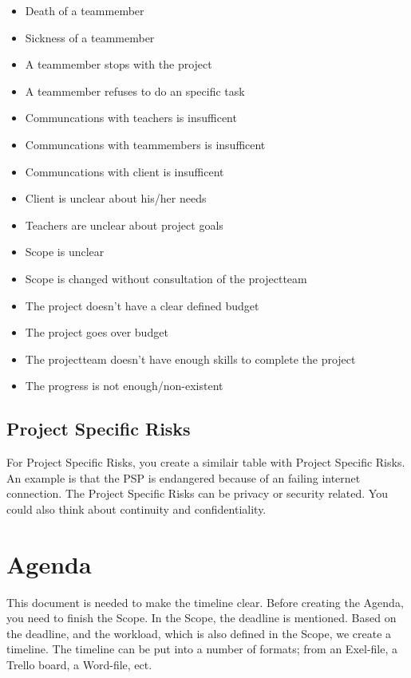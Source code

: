 \documentclass[10pt]{report}
\begin{document}
\begin{itemize}
	\item Death of a teammember
	\item Sickness of a teammember
	\item A teammember stops with the project
	\item A teammember refuses to do an specific task
	\item Communcations with teachers is insufficent
	\item Communcations with teammembers is insufficent
	\item Communcations with client is insufficent
	\item Client is unclear about his/her needs
	\item Teachers are unclear about project goals
	\item Scope is unclear
	\item Scope is changed without consultation of the projectteam
	\item The project doesn't have a clear defined budget
	\item The project goes over budget
	\item The projectteam doesn't have enough skills to complete the project
	\item The progress is not enough/non-existent
\end{itemize}

\subsection{Project Specific Risks}

For Project Specific Risks, you create a similair table with Project Specific Risks. An example is that the PSP is endangered because of an failing internet connection. The Project Specific Risks can be privacy or security related. You could also think about continuity and confidentiality.

\newpage

\section{Agenda}

This document is needed to make the timeline clear. Before creating the Agenda, you need to finish the Scope. In the Scope, the deadline is mentioned. Based on the deadline, and the workload, which is also defined in the Scope, we create a timeline. The timeline can be put into a number of formats; from an Exel-file, a Trello board, a Word-file, ect.
\end{document}
